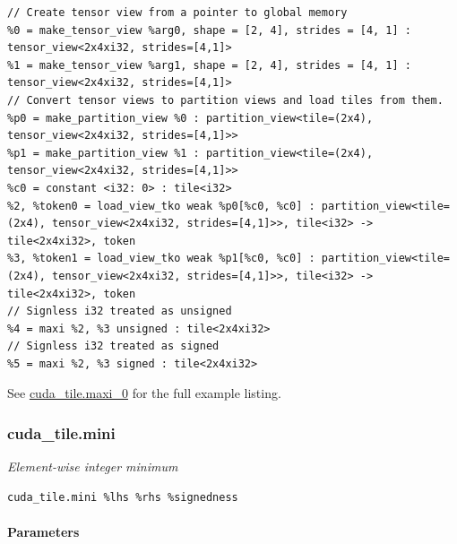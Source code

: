 \documentclass{article}
\begin{document}
\begin{itemize}
\begin{lstlisting}
// Create tensor view from a pointer to global memory
%0 = make_tensor_view %arg0, shape = [2, 4], strides = [4, 1] : tensor_view<2x4xi32, strides=[4,1]>
%1 = make_tensor_view %arg1, shape = [2, 4], strides = [4, 1] : tensor_view<2x4xi32, strides=[4,1]>
// Convert tensor views to partition views and load tiles from them.
%p0 = make_partition_view %0 : partition_view<tile=(2x4), tensor_view<2x4xi32, strides=[4,1]>>
%p1 = make_partition_view %1 : partition_view<tile=(2x4), tensor_view<2x4xi32, strides=[4,1]>>
%c0 = constant <i32: 0> : tile<i32>
%2, %token0 = load_view_tko weak %p0[%c0, %c0] : partition_view<tile=(2x4), tensor_view<2x4xi32, strides=[4,1]>>, tile<i32> -> tile<2x4xi32>, token
%3, %token1 = load_view_tko weak %p1[%c0, %c0] : partition_view<tile=(2x4), tensor_view<2x4xi32, strides=[4,1]>>, tile<i32> -> tile<2x4xi32>, token
// Signless i32 treated as unsigned
%4 = maxi %2, %3 unsigned : tile<2x4xi32>
// Signless i32 treated as signed
%5 = maxi %2, %3 signed : tile<2x4xi32>
\end{lstlisting}

\end{itemize}
See \href{https://docs.nvidia.com/cuda/tile-ir/latest/sections/appendix.html#example-cuda-tile-maxi-0}{cuda\_tile.maxi\_0} for the full example listing.



\subsubsection{cuda\_tile.mini}

\textit{Element-wise integer minimum}


\begin{lstlisting}
cuda_tile.mini %lhs %rhs %signedness
\end{lstlisting}

\paragraph{Parameters}
\end{document}
